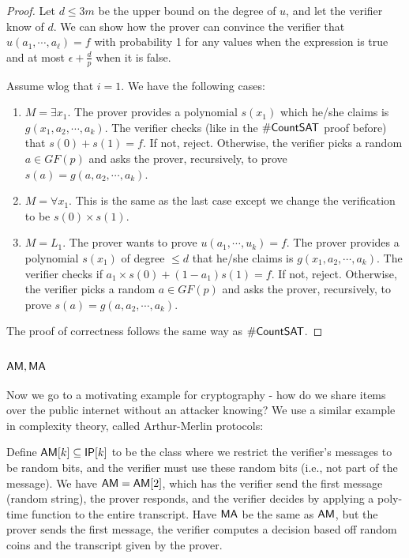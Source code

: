 \begin{proof}
\par Let $d \le 3m$ be the upper bound on the degree of $u$, and let the verifier know of $d$. We can show how the prover can convince the verifier that $u(a_1, \cdots, a_\ell) = f$ with probability 1 for any values when the expression is true and at most $\epsilon + \frac{d}{p}$ when it is false. 

\par Assume wlog that $i=1$. We have the following cases:
\begin{enumerate}
\item $M = \exists x_1$. The prover provides a polynomial $s(x_1)$ which he/she claims is $g(x_1, a_2, \cdots, a_k)$. The verifier checks (like in the ${\mathsf{\#CountSAT}}$ proof before) that $s(0) + s(1) = f$. If not, reject. Otherwise, the verifier picks a random $a \in GF(p)$ and asks the prover, recursively, to prove $s(a) = g(a, a_2, \cdots, a_k)$. 
\item $M = \forall x_1$. This is the same as the last case except we change the verification to be $s(0) \times s(1)$. 
\item $M = L_1$. The prover wants to prove $u(a_1, \cdots, u_k) = f$. The prover provides a polynomial $s(x_1)$ of degree $\le d$ that he/she claims is $g(x_1, a_2, \cdots, a_k)$. The verifier checks if $a_1 \times s(0) + (1-a_1) s(1) = f$. If not, reject. Otherwise, the verifier picks a random $a \in GF(p)$ and asks the prover, recursively, to prove $s(a) = g(a, a_2, \cdots, a_k)$. 
\end{enumerate}
The proof of correctness follows the same way as ${\mathsf{\#CountSAT}}$.
\end{proof}

\subsection{${\mathsf{AM}}, {\mathsf{MA}}$}
Now we go to a motivating example for cryptography - how do we share items over the public internet without an attacker knowing? We use a similar example in complexity theory, called Arthur-Merlin protocols:

\begin{definition}
Define ${\mathsf{AM}}[k] \subseteq {\ensuremath{\mathsf{IP}}}[k]$ to be the class where we restrict the verifier's messages to be random bits, and the verifier must use these random bits (i.e., not part of the message). We have ${\mathsf{AM}} = {\mathsf{AM}}[2]$, which has the verifier send the first message (random string), the prover responds, and the verifier decides by applying a poly-time function to the entire transcript. Have ${\mathsf{MA}}$ be the same as ${\mathsf{AM}}$, but the prover sends the first message, the verifier computes a decision based off random coins and the transcript given by the prover.
\end{definition}

